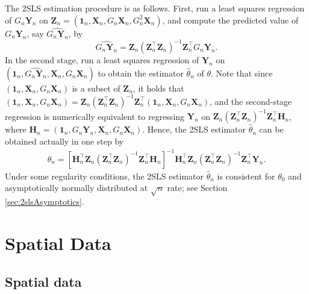 \documentclass[10.5pt, A4paper, openany, uplatex]{book}
\newcommand{\mbf}{\mathbf}
\renewcommand{\hat}{\widehat}
\numberwithin{equation}{section}
\begin{document}
The 2SLS estimation procedure is as follows.
First, run a least squares regression of $G_n \mbf{Y}_n$ on $\mbf{Z}_n = (\mbf{1}_n, \mbf{X}_n, G_n\mbf{X}_n, G_n^2\mbf{X}_n)$, and compute the predicted value of $G_n\mbf{Y}_n$, say $\hat{G_n\mbf{Y}_n}$, by
\[
\hat{G_n\mbf{Y}_n} = \mbf{Z}_n(\mbf{Z}_n^\top \mbf{Z}_n)^{-1}\mbf{Z}_n^\top G_n \mbf{Y}_n.
\]
In the second stage,  run a least squares regression of $\mbf{Y}_n$ on $(\mbf{1}_n, \hat{G_n\mbf{Y}_n}, \mbf{X}_n, G_n\mbf{X}_n)$ to obtain the estimator $\hat \theta_n$ of $\theta$.
Note that since $(\mbf{1}_n, \mbf{X}_n, G_n\mbf{X}_n)$ is a subset of $\mbf{Z}_n$, it holds that $(\mbf{1}_n, \mbf{X}_n, G_n\mbf{X}_n) = \mbf{Z}_n(\mbf{Z}_n^\top \mbf{Z}_n)^{-1}\mbf{Z}_n^\top (\mbf{1}_n, \mbf{X}_n, G_n\mbf{X}_n)$, and the second-stage regression is numerically equivalent to regressing $\mbf{Y}_n$ on $\mbf{Z}_n(\mbf{Z}_n^\top \mbf{Z}_n)^{-1}\mbf{Z}_n^\top \mbf{H}_n$, where $\mbf{H}_n = (\mbf{1}_n, G_n\mbf{Y}_n, \mbf{X}_n, G_n\mbf{X}_n)$.
Hence, the 2SLS estimator $\hat \theta_n$ can be obtained actually in one step by
\begin{align}\label{eq:2slssoc}
\hat \theta_n = \left[\mbf{H}_n^\top \mbf{Z}_n(\mbf{Z}_n^\top \mbf{Z}_n)^{-1}\mbf{Z}_n^\top \mbf{H}_n  \right]^{-1}\mbf{H}_n^\top \mbf{Z}_n(\mbf{Z}_n^\top \mbf{Z}_n)^{-1}\mbf{Z}_n^\top\mbf{Y}_n.
\end{align}
Under some regularity conditions, the 2SLS estimator $\hat \theta_n$ is consistent for $\theta_0$ and asymptotically normally distributed at $\sqrt{n}$ rate; see Section \ref{sec:2slsAsymptotics}.


\chapter{Spatial Data}\label{chap:spatial_correlation}

\section{Spatial data}
\end{document}
